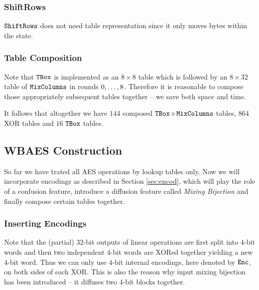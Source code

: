 \subsubsection{ShiftRows}
	
	$\texttt{ShiftRows}$ does not need table representation since it only moves bytes within the state.

\subsubsection{Table Composition}
	
	Note that $\texttt{TBox}$ is implemented as an $8\times 8$ table which is followed by an $8\times 32$ table of $\texttt{MixColumns}$ in rounds $0 , \ldots , 8$. Therefore it is reasonable to compose those appropriately subsequent tables together -- we save both space and time.
	
	It follows that altogether we have $144$ composed $\texttt{TBox}\circ\texttt{MixColumns}$ tables, $864$ XOR tables and $16$ $\texttt{TBox}$ tables.



\subsection{WBAES Construction}
\label{sec:constrwbaes}

So far we have trated all AES operations by lookup tables only. Now we will incorporate encodings as described in Section \ref{sec:encod}, which will play the role of a confusion feature, introduce a diffusion feature called {\em Mixing Bijection} and finally compose certain tables together.

\subsubsection{Inserting Encodings}
	
	Note that the (partial) $32$-bit outputs of linear operations are first split into $4$-bit words and then two independent $4$-bit words are XORed together yielding a new $4$-bit word. Thus we can only use $4$-bit internal encodings, here denoted by $\texttt{Enc}$, on both sides of each XOR. %
	This is also the reason why input mixing bijection has been introduced -- it diffuses two $4$-bit blocks together.
	
